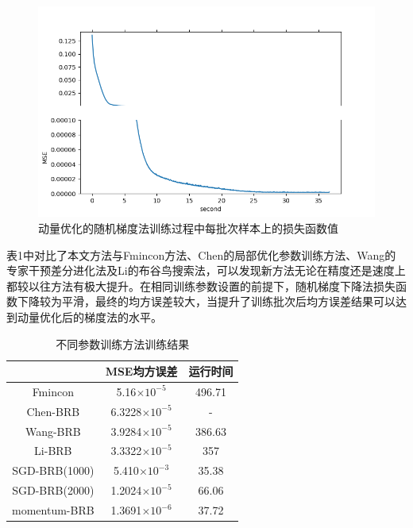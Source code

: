 \documentclass{cjc}
\begin{document}
\begin{figure}
    \includegraphics[width=\linewidth]{momentum_loss.png}
    \caption{动量优化的随机梯度法训练过程中每批次样本上的损失函数值}
\end{figure}

表1中对比了本文方法与Fmincon方法、Chen的局部优化参数训练方法、Wang的专家干预差分进化法及Li的布谷鸟搜索法，可以发现新方法无论在精度还是速度上都较以往方法有极大提升。在相同训练参数设置的前提下，随机梯度下降法损失函数下降较为平滑，最终的均方误差较大，当提升了训练批次后均方误差结果可以达到动量优化后的梯度法的水平。
\begin{table}
    \centering
    \caption{不同参数训练方法训练结果}
    \small
    \begin{tabular}{ccc}
        \toprule
                      & MSE均方误差            & 运行时间 \\
        \midrule
        Fmincon       & 5.16$\times 10^{-5}$   & 496.71   \\
        Chen-BRB      & 6.3228$\times 10^{-5}$ & -        \\
        Wang-BRB      & 3.9284$\times 10^{-5}$ & 386.63   \\
        Li-BRB        & 3.3322$\times 10^{-5}$ & 357      \\
        SGD-BRB(1000) & 5.410$\times 10^{-3}$  & 35.38    \\
        SGD-BRB(2000) & 1.2024$\times 10^{-5}$ & 66.06    \\
        momentum-BRB  & 1.3691$\times 10^{-6}$ & 37.72    \\
        \bottomrule
    \end{tabular}
\end{table}
\end{document}
